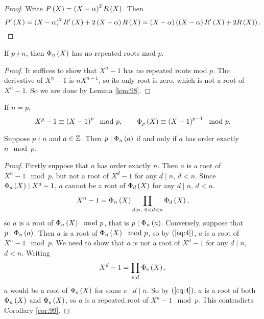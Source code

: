 \begin{proof}
Write $ P\left( X \right) = \left( X - \alpha \right)^2R\left( X \right) $. Then
$$ P'\left( X \right) = \left( X - \alpha \right)^2R'\left( X \right) + 2\left( X - \alpha \right)R\left( X \right) = \left( X - \alpha \right)\left( \left( X - \alpha \right)R'\left( X \right) + 2R\left( X \right) \right). $$
\end{proof}

\begin{corollary}
\label{cor:99}
If $ p \nmid n $, then $ \Phi_n\left( X \right) $ has no repeated roots mod $ p $.
\end{corollary}

\begin{proof}
It suffices to show that $ X^n - 1 $ has no repeated roots mod $ p $. The derivative of $ X^n - 1 $ is $ nX^{n - 1} $, so its only root is zero, which is not a root of $ X^n - 1 $. So we are done by Lemma \ref{lem:98}.
\end{proof}

\begin{note}
If $ n = p $,
$$ X^p - 1 \equiv \left( X - 1 \right)^p \mod p, \qquad \Phi_p\left( X \right) \equiv \left( X - 1 \right)^{p - 1} \mod p. $$
\end{note}

\begin{theorem}
\label{thm:100}
Suppose $ p \nmid n $ and $ a \in \mathbb{Z} $. Then $ p \mid \Phi_n\left( a \right) $ if and only if $ a $ has order exactly $ n \mod p $.
\end{theorem}

\begin{proof}
Firstly suppose that $ a $ has order exactly $ n $. Then $ a $ is a root of $ X^n - 1 \mod p $, but not a root of $ X^d - 1 $ for any $ d \mid n $, $ d < n $. Since $ \Phi_d\left( X \right) \mid X^d - 1 $, $ a $ cannot be a root of $ \Phi_d\left( X \right) $ for any $ d \mid n $, $ d < n $.
\begin{equation}
\label{eq:4}
X^n - 1 = \Phi_n\left( X \right)\prod_{d \mid n, \ 0 < d < n} \Phi_d\left( X \right),
\end{equation}
so $ a $ is a root of $ \Phi_n\left( X \right) \mod p $, that is $ p \mid \Phi_n\left( a \right) $. Conversely, suppose that $ p \mid \Phi_n\left( a \right) $. Then $ a $ is a root of $ \Phi_n\left( X \right) \mod p $, so by $ \left( \ref{eq:4} \right) $, $ a $ is a root of $ X^n - 1 \mod p $. We need to show that $ a $ is not a root of $ X^d - 1 $ for any $ d \mid n $, $ d < n $. Writing
$$ X^d - 1 = \prod_{e \mid d} \Phi_e\left( X \right), $$
$ a $ would be a root of $ \Phi_e\left( X \right) $ for some $ e \mid d \mid n $. So by $ \left( \ref{eq:4} \right) $, $ a $ is a root of both $ \Phi_n\left( X \right) $ and $ \Phi_e\left( X \right) $, so $ a $ is a repeated root of $ X^n - 1 \mod p $. This contradicts Corollary \ref{cor:99}.
\end{proof}

